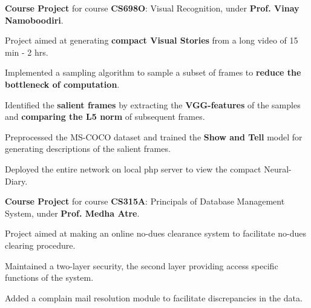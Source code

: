 \documentclass[a4paper]{norm-resume}
\begin{document}
					
	\begin{tightitemize}
	\small
	{
	\item \textbf{Course Project} for course \textbf{CS698O}: Visual Recognition, under \textbf{Prof. Vinay Namoboodiri}.
	\item Project aimed at generating \textbf{compact Visual Stories} from a long video of 15 min - 2 hrs.
    \item Implemented a sampling algorithm to sample a subset of frames to \textbf{reduce the bottleneck of computation}.
    \item Identified the \textbf{salient frames} by extracting the \textbf{VGG-features} of the samples and \textbf{comparing the L5 norm} of subsequent frames.
    \item Preprocessed the MS-COCO dataset and trained the \textbf{Show and Tell} model for generating descriptions of the salient frames.
    \item Deployed the entire network on local php server to view the compact Neural-Diary.
	}
	\end{tightitemize}
		
	\vspace{2mm}
	
				\descript{Jan '17 - Apr '17}	
	\begin{tightitemize}
	\small
	{
	\item \textbf{Course Project} for course \textbf{CS315A}: Principals of Database Management System, under \textbf{Prof. Medha Atre}.
	\item Project aimed at making an online no-dues clearance system to facilitate no-dues clearing procedure.
	\item Maintained a two-layer security, the second layer providing access specific functions of the system.
	\item Added a complain mail resolution module to facilitate discrepancies in the data.
	}
	\end{tightitemize}
		
	\vspace{2mm}
	
\end{document}
